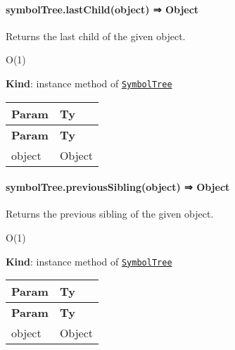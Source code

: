 \label{_module_symbol-tree--SymbolTree+lastChild}%


\paragraph*{symbol\+Tree.\+last\+Child(object) ⇒ {\ttfamily Object}}

Returns the last child of the given object.


\begin{DoxyItemize}
\item {\ttfamily O(1)}
\end{DoxyItemize}

{\bfseries Kind}\+: instance method of {\ttfamily \href{#exp_module_symbol-tree--SymbolTree}{\tt Symbol\+Tree}}

\tabulinesep=1mm
\begin{longtabu} spread 0pt [c]{*{2}{|X[-1]}|}
\hline
\rowcolor{\tableheadbgcolor}\textbf{ Param  }&\textbf{ Ty   }\\
\endfirsthead
\hline
\endfoot
\hline
\rowcolor{\tableheadbgcolor}\textbf{ Param  }&\textbf{ Ty   }\\
\endhead
object  &{\ttfamily Object}   \\
\end{longtabu}


\label{_module_symbol-tree--SymbolTree+previousSibling}%


\paragraph*{symbol\+Tree.\+previous\+Sibling(object) ⇒ {\ttfamily Object}}

Returns the previous sibling of the given object.


\begin{DoxyItemize}
\item {\ttfamily O(1)}
\end{DoxyItemize}

{\bfseries Kind}\+: instance method of {\ttfamily \href{#exp_module_symbol-tree--SymbolTree}{\tt Symbol\+Tree}}

\tabulinesep=1mm
\begin{longtabu} spread 0pt [c]{*{2}{|X[-1]}|}
\hline
\rowcolor{\tableheadbgcolor}\textbf{ Param  }&\textbf{ Ty   }\\
\endfirsthead
\hline
\endfoot
\hline
\rowcolor{\tableheadbgcolor}\textbf{ Param  }&\textbf{ Ty   }\\
\endhead
object  &{\ttfamily Object}   \\
\end{longtabu}


